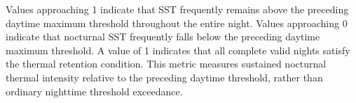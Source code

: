 \begin{longtblr}[
    caption = {CUDAHeat --- Enrichment Rules Catalogue},
    entry = {CUDAHeat enrichment rules catalogue},
    label = {tab:cudaheat-rules},
]
Values approaching 1 indicate that SST frequently remains above the preceding daytime maximum threshold throughout the entire night. Values approaching 0 indicate that nocturnal SST frequently falls below the preceding daytime maximum threshold. A value of 1 indicates that all complete valid nights satisfy the thermal retention condition. This metric measures sustained nocturnal thermal intensity relative to the preceding daytime threshold, rather than ordinary nighttime threshold exceedance. \\

\end{longtblr}
